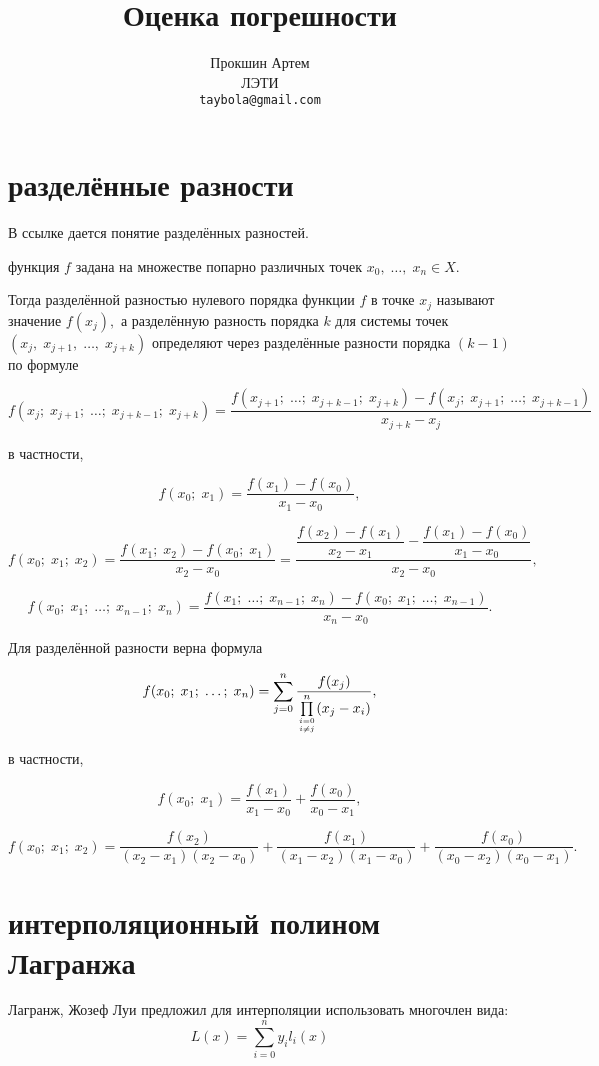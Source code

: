 \documentclass[a4paper,11pt]{article}
\author{ Прокшин Артем \\
\small ЛЭТИ\\
\small \texttt{taybola@gmail.com}}
\title{Оценка погрешности}
\date{}
\begin{document}
\maketitle
\section{разделённые разности}
В ссылке \cite{raznosty} дается понятие разделённых разностей.

функция $f$ задана на множестве попарно различных точек $x_0,\;\ldots,\;x_n \in X.$
 
Тогда
разделённой разностью нулевого порядка функции $f$ в точке $x_j$ называют значение $f(x_j) ,$ а разделённую разность порядка $k$ для системы точек $(x_j, \; x_{j+1}, \; \ldots, \; x_{j+k})$ определяют через разделённые разности порядка $(k-1)$ по формуле

$$
f(x_j; \; x_{j+1}; \; \ldots; \; x_{j+k-1}; \; x_{j+k}) = \frac{f(x_{j+1}; \; \ldots; \; x_{j+k-1}; \; x_{j+k}) - f(x_{j}; \; x_{j+1};\;\ldots;\;x_{j+k-1})}{x_{j+k}-x_{j}}
$$

в частности,

$$f(x_0;\;x_1)=\frac{f(x_1)-f(x_0)}{x_1-x_0} ,$$

$$f(x_0;\;x_1;\;x_2)=\frac{f(x_1;\;x_2)-f(x_0;\;x_1)}{x_2-x_0}=\dfrac{\dfrac{f(x_2)-f(x_1)}{x_2-x_1}-\dfrac{f(x_1)-f(x_0)}{x_1-x_0}}{x_2-x_0} ,$$

$$f(x_0;\;x_1;\;\ldots;\;x_{n-1};\;x_n) = \frac{f(x_1;\;\ldots;\;x_{n-1};\;x_n) - f(x_0;\;x_1;\;\ldots;\;x_{n-1})}{x_n-x_0} .$$

Для разделённой разности верна формула

$$f(x_0;\;x_1;\;\ldots;\;x_n)=\sum_{j=0}^n\dfrac{f(x_j)}{\prod\limits_{i=0\atop i\neq j}^n(x_j-x_i)},$$

в частности,

$$f(x_0;\;x_1)=\frac{f(x_1)}{x_1-x_0}+\frac{f(x_0)}{x_0-x_1} ,$$

$$f(x_0;\;x_1;\;x_2) = \frac{f(x_2)}{(x_2-x_1)(x_2-x_0)}+\frac{f(x_1)}{(x_1-x_2)(x_1-x_0)}+\frac{f(x_0)}{(x_0-x_2)(x_0-x_1)} .$$

\section{интерполяционный полином Лагранжа}
Лагранж, Жозеф Луи предложил для интерполяции использовать многочлен вида:
$$
L(x) = \sum_{i=0}^n y_i l_i(x)
$$
\end{document}
